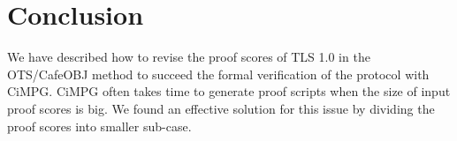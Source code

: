 \documentclass[a4paper,fleqn]{cas-dc}
\begin{document}
\section{Conclusion}\label{conclusion}
We have described how to revise the proof scores of TLS 1.0 in the OTS/CafeOBJ method to succeed the formal verification of the protocol with CiMPG. CiMPG often takes time to generate proof scripts when the size of input
proof scores is big. We found an effective solution for this issue by dividing the proof scores into smaller sub-case.












\end{document}
